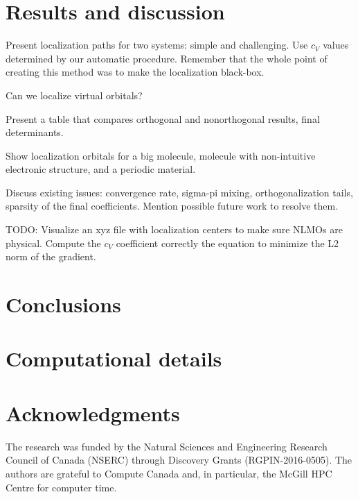 \documentclass[aps,prl,reprint,amsmath,amssymb]{revtex4-1}
\begin{document}
\section{Results and discussion}

Present localization paths for two systems: simple and challenging. Use $c_V$ values determined by our automatic procedure. Remember that the whole point of creating this method was to make the localization black-box.

Can we localize virtual orbitals?

Present a table that compares orthogonal and nonorthogonal results, final determinants.

Show localization orbitals for a big molecule, molecule with non-intuitive electronic structure, and a periodic material.

Discuss existing issues: convergence rate, sigma-pi mixing, orthogonalization tails, sparsity of the final coefficients. Mention possible future work to resolve them.

TODO: Visualize an xyz file with localization centers to make sure NLMOs are physical. Compute the $c_V$ coefficient correctly the equation to minimize the L2 norm of the gradient.

\section{Conclusions}


\section{Computational details}


\section{Acknowledgments} 

The research was funded by the Natural Sciences and Engineering Research Council of Canada (NSERC) through Discovery
Grants (RGPIN-2016-0505). The authors are grateful to Compute Canada and, in particular, the McGill HPC Centre for computer time.



\end{document}
